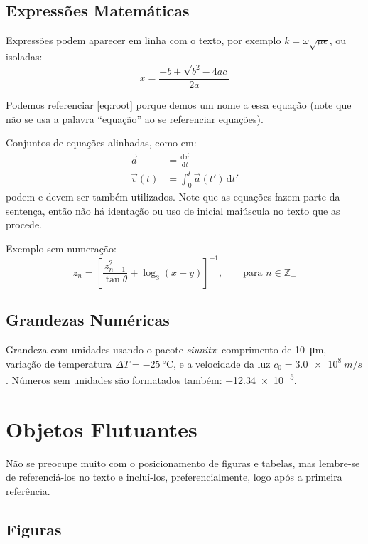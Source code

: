 \subsection{Expressões Matemáticas}
\label{ssec:math}

Expressões podem aparecer em linha com o texto, por exemplo $k = \omega \sqrt{\mu \epsilon}$, ou isoladas:
%
\begin{equation}
\label{eq:root}
x = \frac{-b \pm \sqrt{b^2 - 4ac}}{2a}
\end{equation}

Podemos referenciar \cref{eq:root} porque demos um nome a essa equação (note que não se usa a palavra ``equação'' ao se referenciar equações).

Conjuntos de equações alinhadas, como em:
%
\begin{align}
\vec{a} &= \frac{\mathrm d\vec{v}}{\mathrm dt} \\
\vec{v}(t) &= \int_0^t \vec{a}(t') \, \mathrm dt'
\end{align}
%
podem e devem ser também utilizados.
Note que as equações fazem parte da sentença, então não há identação ou uso de inicial maiúscula no texto que as procede.

Exemplo sem numeração:
%
\begin{equation*}
z_n = \left[\frac{z_{n-1}^2}{\tan\theta} + \log_3(x + y)\right]^{-1},\qquad\text{para } n \in \mathbb{Z}_+
\end{equation*}


\subsection{Grandezas Numéricas}

Grandeza com unidades usando o pacote \emph{siunitx}: comprimento de \SI{10}{\micro m}, variação de temperatura $\Delta T = \SI{-25}{\celsius}$, e a velocidade da luz $c_0 = \SI{3.0e8}{m/s}$.
Números sem unidades são formatados também: \num{-12.34e-5}.


\section{Objetos Flutuantes}

Não se preocupe muito com o posicionamento de figuras e tabelas, mas lembre-se de referenciá-los no texto e incluí-los, preferencialmente, logo após a primeira referência.


\subsection{Figuras}

